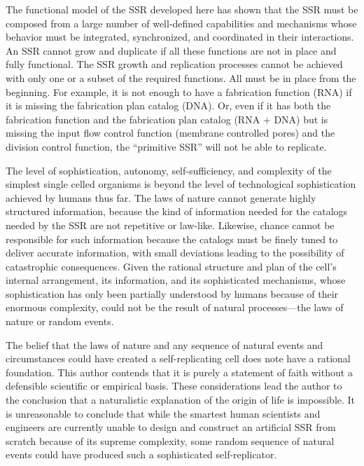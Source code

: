 The functional model of the SSR developed here has shown
that the SSR must be composed from a large number of well-defined
capabilities and mechanisms whose behavior must be integrated, synchronized, and
coordinated in their interactions. An SSR cannot grow and duplicate if 
all these functions are not in place and fully functional. The SSR growth
and replication processes cannot be achieved with only one or a subset of the
required functions.  All must be in place from the beginning.
For example, it is not enough to have a fabrication function (RNA) if it
is missing the fabrication plan catalog (DNA). Or, even if it has both
the fabrication function and the fabrication plan catalog (RNA + DNA)
but is missing the input flow control function (membrane controlled
pores) and the division control function, the ``primitive SSR'' will not
be able to replicate.

The level of sophistication, autonomy,
self-sufficiency, and complexity of the simplest single
celled organisms is beyond the level of technological
sophistication achieved by humans thus far. 
The laws of nature cannot generate highly structured information, because
the kind of information needed for the catalogs needed by the SSR are
not repetitive or law-like.  Likewise, chance cannot be responsible for
such information because the catalogs must be finely tuned to deliver
accurate information, with small deviations leading to the possibility of
catastrophic consequences.
Given the rational structure and plan of the cell's internal
arrangement, its information, and its sophisticated
mechanisms, whose sophistication has only been partially
understood by humans because of their enormous complexity, could not be the
result of natural processes---the laws of nature or random events.

The belief that the laws of
nature and any sequence of natural events and circumstances
could have created a self-replicating cell does note have a rational
foundation.  This author contends that it is purely a statement of faith without a defensible
scientific or empirical basis.
These considerations lead the author to the conclusion that a naturalistic
explanation of the origin of life is impossible.
It is unreasonable to conclude that while the smartest
human scientists and engineers are currently unable to design and
construct an artificial SSR from scratch because of its supreme
complexity, some random sequence of natural events could have produced
such a sophisticated self-replicator.

